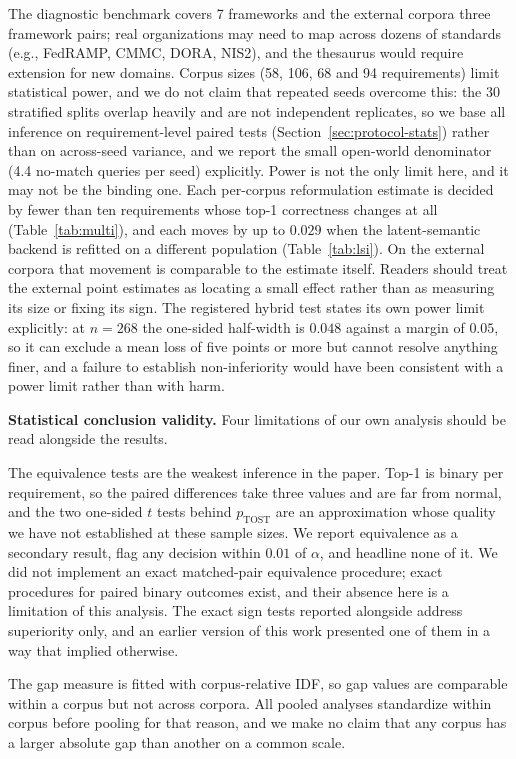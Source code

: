 \documentclass[smallextended,natbib]{svjour3}
\begin{document}
The diagnostic benchmark covers 7 frameworks and the external corpora three framework pairs; real organizations may need to map across dozens of standards (e.g., FedRAMP, CMMC, DORA, NIS2), and the thesaurus would require extension for new domains.
Corpus sizes (58, 106, 68 and 94 requirements) limit statistical power, and we do not claim that repeated seeds overcome this: the 30 stratified splits overlap heavily and are not independent replicates, so we base all inference on requirement-level paired tests (Section~\ref{sec:protocol-stats}) rather than on across-seed variance, and we report the small open-world denominator (4.4 no-match queries per seed) explicitly.
Power is not the only limit here, and it may not be the binding one. Each per-corpus reformulation estimate is decided by fewer than ten requirements whose top-1 correctness changes at all (Table~\ref{tab:multi}), and each moves by up to $0.029$ when the latent-semantic backend is refitted on a different population (Table~\ref{tab:lsi}). On the external corpora that movement is comparable to the estimate itself. Readers should treat the external point estimates as locating a small effect rather than as measuring its size or fixing its sign.
The registered hybrid test states its own power limit explicitly: at $n = 268$ the one-sided half-width is $0.048$ against a margin of $0.05$, so it can exclude a mean loss of five points or more but cannot resolve anything finer, and a failure to establish non-inferiority would have been consistent with a power limit rather than with harm.

\noindent\textbf{Statistical conclusion validity.}
Four limitations of our own analysis should be read alongside the results.

The equivalence tests are the weakest inference in the paper. Top-1 is binary per requirement, so the paired differences take three values and are far from normal, and the two one-sided $t$ tests behind $p_{\text{TOST}}$ are an approximation whose quality we have not established at these sample sizes. We report equivalence as a secondary result, flag any decision within $0.01$ of $\alpha$, and headline none of it. We did not implement an exact matched-pair equivalence procedure; exact procedures for paired binary outcomes exist, and their absence here is a limitation of this analysis. The exact sign tests reported alongside address superiority only, and an earlier version of this work presented one of them in a way that implied otherwise.

The gap measure is fitted with corpus-relative IDF, so gap values are comparable within a corpus but not across corpora. All pooled analyses standardize within corpus before pooling for that reason, and we make no claim that any corpus has a larger absolute gap than another on a common scale.
\end{document}
